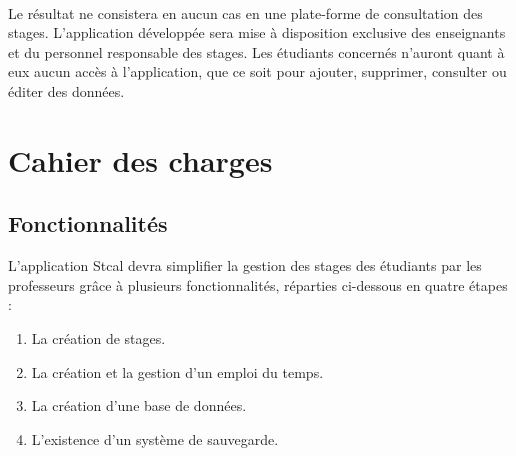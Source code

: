 \documentclass[a4paper,10pt]{report}
\begin{document}
  \paragraph{}
    Le résultat ne consistera en aucun cas en une plate-forme de consultation des stages.
    L'application développée sera mise à disposition exclusive des enseignants et du personnel responsable des stages. 
    Les étudiants concernés n'auront quant à eux aucun accès à l'application, que ce soit pour ajouter, supprimer, consulter ou éditer des données.



    
    
    
\part{Cahier des charges}
  
  \chapter{Fonctionnalités}

    L'application Stcal devra simplifier la gestion des stages des étudiants par les professeurs grâce à plusieurs fonctionnalités, réparties ci-dessous en quatre étapes  :

    \begin{enumerate}
      \item La création de stages.
      \item La création et la gestion d’un emploi du temps.
      \item La création d'une base de données. 
      \item L'existence d'un système de sauvegarde.
    \end{enumerate}
  
  
  
  
\end{document}
